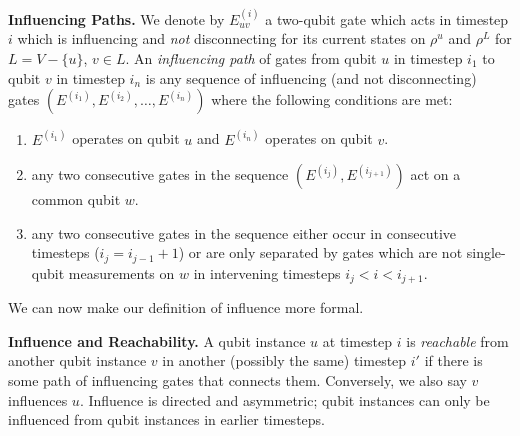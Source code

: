 \begin{definition}{\textbf{Influencing Paths.}}
We denote by $E^{(i)}_{uv}$ a two-qubit gate which acts in
timestep $i$ which is influencing and \emph{not} disconnecting for its current states
on $\rho^{u}$ and $\rho^{L}$ for $L = V - \{u\}$, $v \in L$.
An \emph{influencing path} of gates from qubit $u$ in timestep $i_1$ to
qubit $v$ in timestep $i_n$ is
any sequence of influencing (and not disconnecting)
gates $(E^{(i_1)}, E^{(i_2)}, \ldots, E^{(i_n)})$
where the following conditions are met:

\begin{enumerate}
\item
$E^{(i_1)}$ operates on qubit $u$ and $E^{(i_n)}$ operates on qubit $v$.

\item
any two consecutive gates in the sequence $(E^{(i_j)},E^{(i_{j+1})})$
act on a common qubit $w$.
\item
any two consecutive gates in the sequence either occur in
consecutive timesteps ($i_j = i_{j-1} + 1$) or are only separated by
gates which are not single-qubit measurements on $w$ in intervening timesteps $i_j < i < i_{j+1}$.

\end{enumerate}

\end{definition}

We can now make our definition of influence more formal.

\begin{definition}{\textbf{Influence and Reachability.}}
A qubit instance $u$ at timestep $i$ is \emph{reachable} from another qubit
instance $v$ in
another (possibly the same) timestep $i'$ if there is some path of influencing
gates that connects them. Conversely, we also say $v$ influences $u$.
Influence is directed and asymmetric; qubit
instances can only be influenced from qubit instances in earlier timesteps.
\end{definition}

